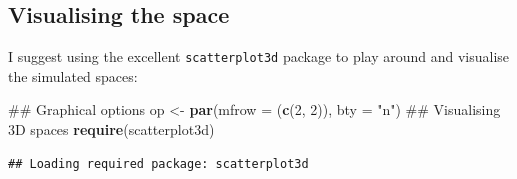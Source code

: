 \documentclass[]{book}
\newenvironment{Shaded}{\begin{snugshade}}{\end{snugshade}}
\newcommand{\KeywordTok}[1]{\textcolor[rgb]{0.13,0.29,0.53}{\textbf{#1}}}
\newcommand{\DataTypeTok}[1]{\textcolor[rgb]{0.13,0.29,0.53}{#1}}
\newcommand{\DecValTok}[1]{\textcolor[rgb]{0.00,0.00,0.81}{#1}}
\newcommand{\StringTok}[1]{\textcolor[rgb]{0.31,0.60,0.02}{#1}}
\newcommand{\NormalTok}[1]{#1}
\theoremstyle{definition}
\theoremstyle{definition}
\theoremstyle{remark}
\begin{document}
\subsection{Visualising the space}\label{visualising-the-space}

I suggest using the excellent \texttt{scatterplot3d} package to play
around and visualise the simulated spaces:

\begin{Shaded}
\begin{Highlighting}[]
\NormalTok{## Graphical options}
\NormalTok{op <-}\StringTok{ }\KeywordTok{par}\NormalTok{(}\DataTypeTok{mfrow =}\NormalTok{ (}\KeywordTok{c}\NormalTok{(}\DecValTok{2}\NormalTok{, }\DecValTok{2}\NormalTok{)), }\DataTypeTok{bty =} \StringTok{"n"}\NormalTok{)}
\NormalTok{## Visualising 3D spaces}
\KeywordTok{require}\NormalTok{(scatterplot3d)}
\end{Highlighting}
\end{Shaded}

\begin{verbatim}
## Loading required package: scatterplot3d
\end{verbatim}
\end{document}
